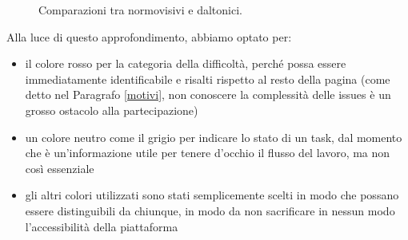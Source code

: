\documentclass[12pt]{article} %
\begin{document}
\begin{figure}[H] 
\caption{Comparazioni tra normovisivi e daltonici.}
\label{fig:daltonici}
\end{figure}

Alla luce di questo approfondimento, abbiamo optato per:
\begin{itemize}
\item il colore rosso per la categoria della difficoltà, perché possa essere immediatamente identificabile e risalti rispetto al resto della pagina (come detto nel Paragrafo \ref{motivi}, non conoscere la complessità delle issues è un grosso ostacolo alla partecipazione)
\item un colore neutro come il grigio per indicare lo stato di un task, dal momento che è un'informazione utile per tenere d'occhio il flusso del lavoro, ma non così essenziale
\item gli altri colori utilizzati sono stati semplicemente scelti in modo che possano essere distinguibili da chiunque, in modo da non sacrificare in nessun modo l'accessibilità della piattaforma 
\end{itemize}



\cite{*}

\newpage


\end{document}
